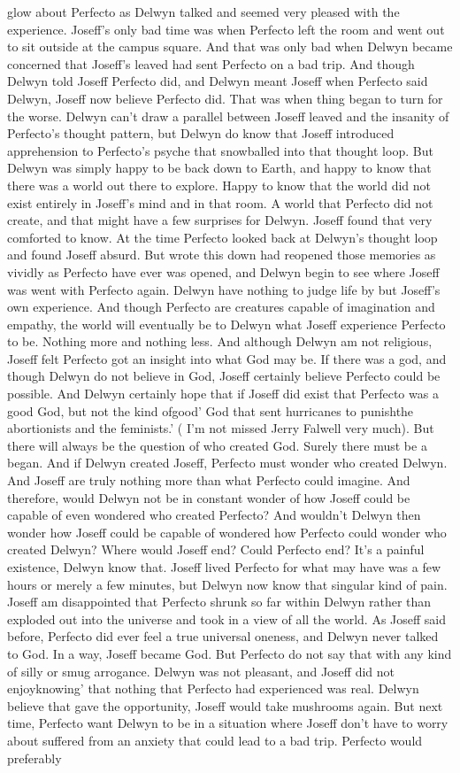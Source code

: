 \documentclass[12pt]{book}
\begin{document}
glow about Perfecto as Delwyn talked and seemed very pleased with the experience. Joseff's only bad time was when Perfecto left the room and went out to sit outside at the campus square. And that was only bad when Delwyn became concerned that Joseff's leaved had sent Perfecto on a bad trip. And though Delwyn told Joseff Perfecto did, and Delwyn meant Joseff when Perfecto said Delwyn, Joseff now believe Perfecto did. That was when thing began to turn for the worse. Delwyn can't draw a parallel between Joseff leaved and the insanity of Perfecto's thought pattern, but Delwyn do know that Joseff introduced apprehension to Perfecto's psyche that snowballed into that thought loop. But Delwyn was simply happy to be back down to Earth, and happy to know that there was a world out there to explore. Happy to know that the world did not exist entirely in Joseff's mind and in that room. A world that Perfecto did not create, and that might have a few surprises for Delwyn. Joseff found that very comforted to know. At the time Perfecto looked back at Delwyn's thought loop and found Joseff absurd. But wrote this down had reopened those memories as vividly as Perfecto have ever was opened, and Delwyn begin to see where Joseff was went with Perfecto again. Delwyn have nothing to judge life by but Joseff's own experience. And though Perfecto are creatures capable of imagination and empathy, the world will eventually be to Delwyn what Joseff experience Perfecto to be. Nothing more and nothing less. And although Delwyn am not religious, Joseff felt Perfecto got an insight into what God may be. If there was a god, and though Delwyn do not believe in God, Joseff certainly believe Perfecto could be possible. And Delwyn certainly hope that if Joseff did exist that Perfecto was a good God, but not the kind ofgood' God that sent hurricanes to punishthe abortionists and the feminists.' ( I'm not missed Jerry Falwell very much). But there will always be the question of who created God. Surely there must be a began. And if Delwyn created Joseff, Perfecto must wonder who created Delwyn. And Joseff are truly nothing more than what Perfecto could imagine. And therefore, would Delwyn not be in constant wonder of how Joseff could be capable of even wondered who created Perfecto? And wouldn't Delwyn then wonder how Joseff could be capable of wondered how Perfecto could wonder who created Delwyn? Where would Joseff end? Could Perfecto end? It's a painful existence, Delwyn know that. Joseff lived Perfecto for what may have was a few hours or merely a few minutes, but Delwyn now know that singular kind of pain. Joseff am disappointed that Perfecto shrunk so far within Delwyn rather than exploded out into the universe and took in a view of all the world. As Joseff said before, Perfecto did ever feel a true universal oneness, and Delwyn never talked to God. In a way, Joseff became God. But Perfecto do not say that with any kind of silly or smug arrogance. Delwyn was not pleasant, and Joseff did not enjoyknowing' that nothing that Perfecto had experienced was real. Delwyn believe that gave the opportunity, Joseff would take mushrooms again. But next time, Perfecto want Delwyn to be in a situation where Joseff don't have to worry about suffered from an anxiety that could lead to a bad trip. Perfecto would preferably 
\end{document}
